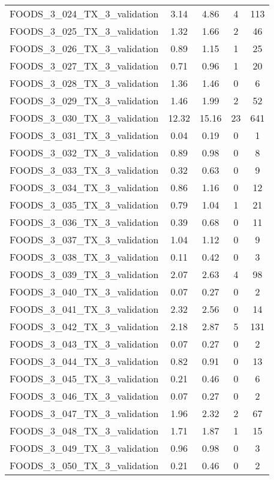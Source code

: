 \begin{table}
\begin{tabular}{|l|c|c|c|c|}
FOODS\_3\_024\_TX\_3\_validation & 3.14 & 4.86 & 4 & 113 \\
FOODS\_3\_025\_TX\_3\_validation & 1.32 & 1.66 & 2 & 46 \\
FOODS\_3\_026\_TX\_3\_validation & 0.89 & 1.15 & 1 & 25 \\
FOODS\_3\_027\_TX\_3\_validation & 0.71 & 0.96 & 1 & 20 \\
FOODS\_3\_028\_TX\_3\_validation & 1.36 & 1.46 & 0 & 6 \\
FOODS\_3\_029\_TX\_3\_validation & 1.46 & 1.99 & 2 & 52 \\
FOODS\_3\_030\_TX\_3\_validation & 12.32 & 15.16 & 23 & 641 \\
FOODS\_3\_031\_TX\_3\_validation & 0.04 & 0.19 & 0 & 1 \\
FOODS\_3\_032\_TX\_3\_validation & 0.89 & 0.98 & 0 & 8 \\
FOODS\_3\_033\_TX\_3\_validation & 0.32 & 0.63 & 0 & 9 \\
FOODS\_3\_034\_TX\_3\_validation & 0.86 & 1.16 & 0 & 12 \\
FOODS\_3\_035\_TX\_3\_validation & 0.79 & 1.04 & 1 & 21 \\
FOODS\_3\_036\_TX\_3\_validation & 0.39 & 0.68 & 0 & 11 \\
FOODS\_3\_037\_TX\_3\_validation & 1.04 & 1.12 & 0 & 9 \\
FOODS\_3\_038\_TX\_3\_validation & 0.11 & 0.42 & 0 & 3 \\
FOODS\_3\_039\_TX\_3\_validation & 2.07 & 2.63 & 4 & 98 \\
FOODS\_3\_040\_TX\_3\_validation & 0.07 & 0.27 & 0 & 2 \\
FOODS\_3\_041\_TX\_3\_validation & 2.32 & 2.56 & 0 & 14 \\
FOODS\_3\_042\_TX\_3\_validation & 2.18 & 2.87 & 5 & 131 \\
FOODS\_3\_043\_TX\_3\_validation & 0.07 & 0.27 & 0 & 2 \\
FOODS\_3\_044\_TX\_3\_validation & 0.82 & 0.91 & 0 & 13 \\
FOODS\_3\_045\_TX\_3\_validation & 0.21 & 0.46 & 0 & 6 \\
FOODS\_3\_046\_TX\_3\_validation & 0.07 & 0.27 & 0 & 2 \\
FOODS\_3\_047\_TX\_3\_validation & 1.96 & 2.32 & 2 & 67 \\
FOODS\_3\_048\_TX\_3\_validation & 1.71 & 1.87 & 1 & 15 \\
FOODS\_3\_049\_TX\_3\_validation & 0.96 & 0.98 & 0 & 3 \\
FOODS\_3\_050\_TX\_3\_validation & 0.21 & 0.46 & 0 & 2 \\

\end{tabular}
\end{table}
